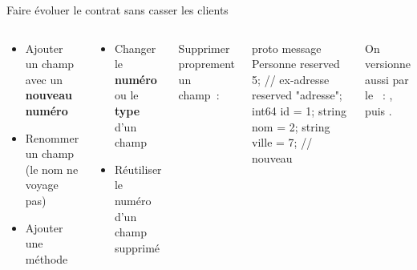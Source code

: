 \documentclass[aspectratio=169,11pt]{beamer}
\begin{document}
\begin{frame}[fragile]{Faire évoluer le contrat sans casser les clients}
  \begin{columns}[T,onlytextwidth]
    \begin{carte}[ggreen]\footnotesize
      \begin{itemize}
        \item Ajouter un champ avec un \textbf{nouveau numéro}
        \item Renommer un champ (le nom ne voyage pas)
        \item Ajouter une méthode 
      \end{itemize}
    \end{carte}
    \begin{carte}[gred]\footnotesize
      \begin{itemize}
        \item Changer le \textbf{numéro} ou le \textbf{type} d'un champ
        \item Réutiliser le numéro d'un champ supprimé
      \end{itemize}
    \end{carte}
    \small Supprimer proprement un champ~:
\begin{code}{proto}
message Personne {
  reserved 5;         // ex-adresse
  reserved "adresse";
  int64  id    = 1;
  string nom   = 2;
  string ville = 7;   // nouveau
}
\end{code}
    \scriptsize\color{Muted} On versionne aussi par le ~: , puis .
  \end{columns}
\end{frame}
\end{document}
